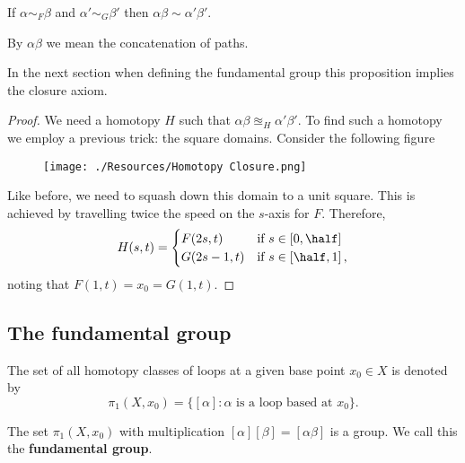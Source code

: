 \documentclass[12pt, a4paper]{article}
\begin{document}
\begin{mdprop}
    If \(\alpha \sim_F \beta\) and \(\alpha'\sim_G \beta'\) then \(\alpha\beta \sim \alpha'\beta'\).
\end{mdprop}

\begin{mdremark}
    By \(\alpha\beta\) we mean the concatenation of paths.
\end{mdremark}

\begin{mdnote}
    In the next section when defining the fundamental group this proposition implies the closure axiom.
\end{mdnote}

\begin{proof}
    We need a homotopy \(H\) such that \(\alpha\beta \approxeq_H \alpha'\beta'\). To find such a homotopy we employ a previous trick: the square domains. Consider the following figure 
    \begin{figure}[H]
         \begin{center}
             \texttt{[image: ./Resources/Homotopy Closure.png]}
         \end{center}
    \end{figure}
    Like before, we need to squash down this domain to a unit square. This is achieved by travelling twice the speed on the \(s\)-axis for \(F\). Therefore, 
    \[H(s,t) =\begin{cases}
        F(2s,t) &\text{if } s\in\left[ 0,\half \right]\\
        G(2s-1,t) &\text{if } s\in \left[ \half,1 \right],
    \end{cases}\]
    noting that \(F(1,t)=x_0=G(1,t)\).
\end{proof}

\subsection{The fundamental group}

\begin{definition}
    The set of all homotopy classes of loops at a given base point \(x_0 \in X\) is denoted by 
    \[\pi_1(X,x_0) = \{[\alpha] : \alpha \text{ is a loop based at }x_0\}.\]
\end{definition}

\begin{mdprop}
    The set \(\pi_1(X,x_0)\) with multiplication \([\alpha][\beta]=[\alpha\beta]\) is a group. We call this the \textbf{fundamental group}.
\end{mdprop}
\end{document}
